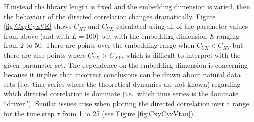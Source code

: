\documentclass[a4paper,11pt]{article}
\begin{document}
If instead the library length is fixed and the embedding dimension is varied, then the behaviour of the directed correlation changes dramatically.  Figure \ref{fig:CxyCyxVE} shows $C_{XY}$ and $C_{YX}$ calculated using all of the parameter values from above (and with $L=100$) but with the embedding dimension $E$ ranging from 2 to 50.  There are points over the embedding range when $C_{YX}<C_{XY}$ but there are also points where $C_{YX}>C_{XY}$, which is difficult to interpret with the given parameter set.  The dependence on the embedding dimension is concerning because it implies that incorrect conclusions can be drawn about natural data sets (i.e.\ time series where the theoretical dynamics are not known) regarding which directed correlation is dominate (i.e.\ which time series is the dominate ``driver'').  Similar issues arise when plotting the directed correlation over a range for the time step $\tau$ from 1 to 25 (see Figure \ref{fig:CxyCyxVtau}).  
\end{document}
